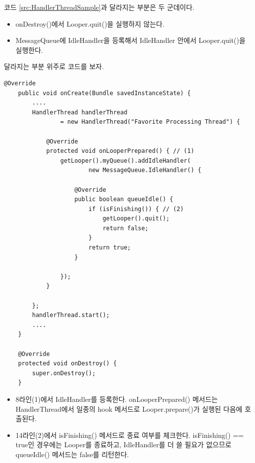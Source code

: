코드 \ref{src:HandlerThreadSample}과 달라지는 부분은 두 군데이다.
\begin{itemize}
\item onDestroy()에서 Looper.quit()을 실행하지 않는다.
\item MessageQueue에 IdleHandler을 등록해서 IdleHandler 안에서 Looper.quit()을 실행한다.
\end{itemize}

달라지는 부분 위주로 코드를 보자.
\begin{lstlisting}[frame=single, caption=Handler 스레드 사용 예제(Fixed), label=src:HandlerThreadSample2] 
 	@Override
    public void onCreate(Bundle savedInstanceState) {
    	....
        HandlerThread handlerThread
                = new HandlerThread("Favorite Processing Thread") {

            @Override
            protected void onLooperPrepared() { // (1)
                getLooper().myQueue().addIdleHandler(
                		new MessageQueue.IdleHandler() {

                    @Override
                    public boolean queueIdle() {
                        if (isFinishing()) { // (2)
                            getLooper().quit();
                            return false;
                        }
                        return true;
                    }

                });
            }

        };
        handlerThread.start();
        ....
	}
	
	@Override
    protected void onDestroy() {
        super.onDestroy();
    }
\end{lstlisting}

\begin{itemize}
\item 8라인(1)에서 IdleHandler를 등록한다. onLooperPrepared() 메서드는 HandlerThread에서 일종의 hook 메서드로 Looper.prepare()가 실행된 다음에 호출된다.
\item 14라인(2)에서 isFinishing() 메서드로 종료 여부를 체크한다. isFinishing() == true인 경우에는 Looper를 종료하고, IdleHandler를 더 쓸 필요가 없으므로 queueIdle() 메서드는 false를 리턴한다.
\end{itemize}

